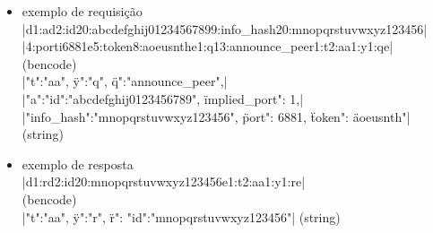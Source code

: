 
\begin{itemize}
    \item exemplo de requisição \\
        \bverb|d1:ad2:id20:abcdefghij01234567899:info_hash20:mnopqrstuvwxyz123456| \\
        \bverb|4:porti6881e5:token8:aoeusnthe1:q13:announce_peer1:t2:aa1:y1:qe| \\
        (\gls*{bencode}) \\
        \sverb|{"t":"aa", \"y":"q", \"q":"announce_peer",| \\
        \sverb|"a":{"id":"abcdefghij0123456789", \"implied_port": 1,| \\
        \sverb|"info_hash":"mnopqrstuvwxyz123456", \"port": 6881, \"token": \"aoeusnth"}}|
        (\gls*{string})

    \item exemplo de resposta \\
        \bverb|d1:rd2:id20:mnopqrstuvwxyz123456e1:t2:aa1:y1:re| \\
        (\gls*{bencode}) \\
        \sverb|{"t":"aa", \"y":"r", \"r": {"id":"mnopqrstuvwxyz123456"}}|
        (\gls*{string})
\end{itemize}